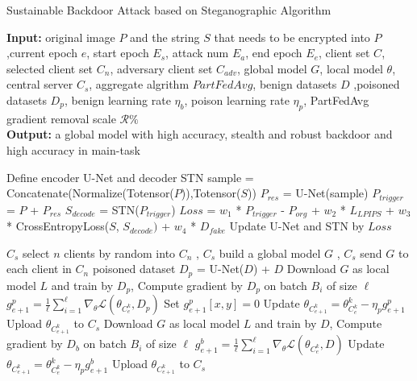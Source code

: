 \documentclass{article}
\begin{document}
\begin{algorithm}[t]
	\caption{Sustainable Backdoor Attack based on Steganographic Algorithm} %
	\hspace*{0.02in} {\bf Input:} %
	{original image $P$ and the string $S$ that needs to be encrypted into $P$,current epoch $e$, start epoch $E_s$, attack num $E_a$, end epoch $E_e$, client set $C$, selected client set $C_n$, adversary client set $C_{adv}$, global model $G$, local model $\theta$, central server $C_s$, aggregate algrithm $PartFedAvg$, benign datasets ${D}$ ,poisoned datasets ${D_p}$, benign learning rate $\eta_b$, poison learning rate $\eta_p$, PartFedAvg gradient removal scale $ \mathcal{R\%} $}\\
	\hspace*{0.02in} {\bf Output:} %
	a global model with high accuracy, stealth and robust backdoor and high accuracy in main-task


	\begin{algorithmic}[1]

	\State Define encoder U-Net and decoder STN
		\State sample = Concatenate(Normalize(Totensor($P$)),Totensor($S$))
		\State $P_{res}$ = U-Net(sample)
		\State $P_{trigger}$ = $P$ + $P_{res}$
		\State $S_{decode}$ = STN($P_{trigger}$)
		\State $⁡Loss$ = $w_1$ * $P_{trigger}$ - $P_{org}$ + $w_2$ * $L_{LPIPS}$ + $w_3$ * CrossEntropyLoss($S$, $S_{decode})$ + $w_4$ * $D_{fake}$
		\State Update U-Net and STN by $⁡Loss$
	\EndWhile


	\State $C_s$ select $n$ clients by random into $C_n$ %
	, $C_s$ build a global model $G$
	, $C_s$ send $G$ to each client in $C_n$
				\State poisoned dataset ${D_p}$ = U-Net($D$) + $D$
				\State Download $G$ as local model $L$ and train by ${D_p}$, 
				\State Compute gradient by ${D}_p$ on batch $B_i$ of size $\ell$
				\State $ g_{e+1}^p = \frac{1}{\ell}\sum_{i = 1}^{\ell}\nabla_\theta \mathcal{L}(\theta_{C^k_e}, {D_p}) $
						\State Set $g_{e+1}^p[x,y] = 0$
					\EndIf
				\EndFor
				\State Update $ \theta_{C^k_{e+1}} = \theta^k_{C^k_e} - \eta_p g_{e+1}^p $ 
				\State Upload $ \theta_{C^k_{e+1}}$ to $C_s $
				\State Download $G$ as local model $L$ and train by ${D}$, 
				\State Compute gradient by ${D}_b$ on batch $B_i$ of size $\ell$
				\State $ g_{e+1}^b = \frac{1}{\ell}\sum_{i = 1}^{\ell}\nabla_\theta \mathcal{L}(\theta_{C^k_e}, {D}) $
				\State Update $ \theta_{C^k_{e+1}} = \theta^k_{C^k_e} - \eta_p g_{e+1}^b $ 
				\State Upload $ \theta_{C^k_{e+1}}$ to $C_s $
			\EndIf
			

\end{algorithmic}
\end{algorithm}
\end{document}
